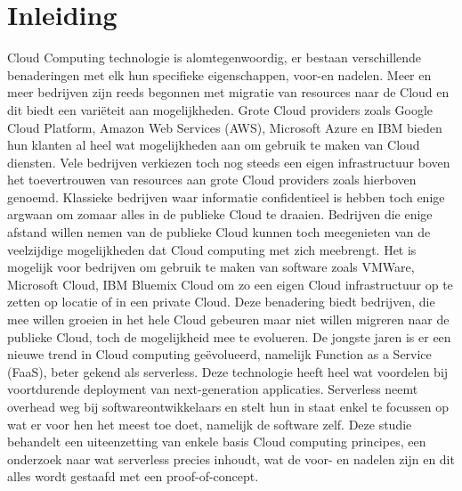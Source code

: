 
\chapter{Inleiding}
\label{ch:inleiding}

Cloud Computing technologie is alomtegenwoordig, er bestaan verschillende benaderingen met elk hun specifieke eigenschappen, voor-en nadelen. Meer en meer bedrijven zijn reeds begonnen met migratie van resources naar de Cloud en dit biedt een variëteit aan mogelijkheden. Grote Cloud providers zoals Google Cloud Platform, Amazon Web Services (AWS), Microsoft Azure en IBM bieden hun klanten al heel wat mogelijkheden aan om gebruik te maken van Cloud diensten. Vele bedrijven verkiezen toch nog steeds een eigen infrastructuur boven het toevertrouwen van resources aan grote Cloud providers zoals hierboven genoemd. Klassieke bedrijven waar informatie confidentieel is hebben toch enige argwaan om zomaar alles in de publieke Cloud te draaien. Bedrijven die enige afstand willen nemen van de publieke Cloud kunnen toch meegenieten van de veelzijdige mogelijkheden dat Cloud computing met zich meebrengt. Het is mogelijk voor bedrijven om gebruik te maken van software zoals VMWare, Microsoft Cloud, IBM Bluemix Cloud om zo een eigen Cloud infrastructuur op te zetten op locatie of in een private Cloud. Deze benadering biedt bedrijven, die mee willen groeien in het hele Cloud gebeuren maar niet willen migreren naar de publieke Cloud, toch de mogelijkheid mee te evolueren.
\newline
\newline
De jongste jaren is er een nieuwe trend in Cloud computing geëvolueerd, namelijk Function as a Service (FaaS), beter gekend als serverless. Deze technologie heeft heel wat voordelen bij voortdurende deployment van next-generation applicaties. Serverless neemt overhead weg bij softwareontwikkelaars en stelt hun in staat enkel te focussen op wat er voor hen het meest toe doet, namelijk de software zelf.
\newline
\newline
Deze studie behandelt een uiteenzetting van enkele basis Cloud computing principes, een onderzoek naar wat serverless precies inhoudt, wat de voor- en nadelen zijn en dit alles wordt gestaafd met een proof-of-concept.

